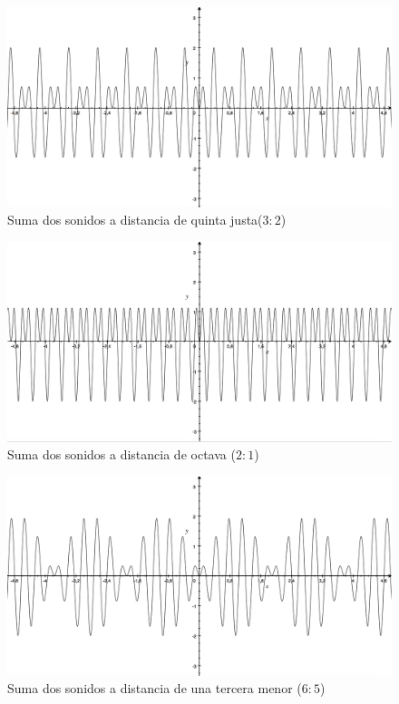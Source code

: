 \documentclass[11pt,a4paper]{article}
\begin{document}
	\begin{figure}[h]
		\centering	
		\includegraphics[scale=.35]{Quinta}         %
		\caption{Suma dos sonidos a distancia de quinta justa($3:2$)}
	\end{figure}
	
		\begin{figure}[h]
		\centering	
		\includegraphics[scale=.35]{Octava}
		\caption{Suma dos sonidos a distancia de octava ($2:1$)}
	\end{figure}
	
	\begin{figure}[h]
		\centering	
		\includegraphics[scale=.35]{TerceraMenor}
		\caption{Suma dos sonidos a distancia de una tercera menor ($6:5$)}
	\end{figure}
	
\end{document}
